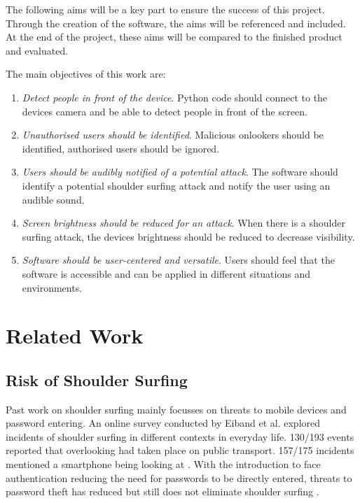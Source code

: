 \documentclass[12pt]{article}
\theoremstyle{plain}
\theoremstyle{definition}
\begin{document}
The following aims will be a key part to ensure the success of this project. Through the creation of the software, the aims will be referenced and included. At the end of the project, these aims will be compared to the finished product and evaluated.

The main objectives of this work are:
\begin{enumerate}
\item \emph{Detect people in front of the device}. Python code should connect to the devices camera and be able to detect people in front of the screen.

\item \emph{Unauthorised users should be identified}. Malicious onlookers should be identified, authorised users should be ignored.

\item \emph{Users should be audibly notified of a potential attack}. The software should identify a potential shoulder surfing attack and notify the user using an audible sound.

\item \emph{Screen brightness should be reduced for an attack}. When there is a shoulder surfing attack, the devices brightness should be reduced to decrease visibility.

\item \emph{Software should be user-centered and versatile}. Users should feel that the software is accessible and can be applied in different situations and environments.

\end{enumerate}

\section{Related Work}
\label{sec:related_work}
\subsection{Risk of Shoulder Surfing}
Past work on shoulder surfing mainly focusses on threats to mobile devices and password entering. An online survey conducted by Eiband et al. explored incidents of shoulder surfing in different contexts in everyday life. 130/193 events reported that overlooking had taken place on public transport. 157/175 incidents mentioned a smartphone being looking at \cite{eiband_understanding_2017}. With the introduction to face authentication reducing the need for passwords to be directly entered, threats to password theft has reduced but still does not eliminate shoulder surfing \cite{sun_privacymask_2023}.
\end{document}
